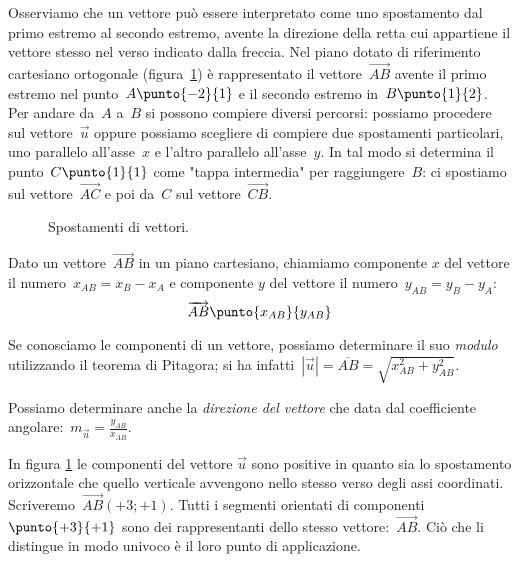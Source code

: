 Osserviamo che un vettore può essere interpretato come uno spostamento dal 
primo estremo al secondo estremo, avente la direzione della retta cui appartiene 
il vettore stesso nel
verso indicato dalla freccia.
Nel piano dotato di riferimento cartesiano ortogonale (figura~\ref{fig:F.4}) 
è rappresentato il vettore~$\overrightarrow{AB}$ avente 
il primo estremo nel punto~$A\punto{-2}{1}$ e
il secondo estremo in~$B\punto{1}{2}$. 
Per andare da~$A$ a~$B$ si possono compiere diversi percorsi: 
possiamo procedere sul vettore~$\vec{u}$ oppure possiamo scegliere di compiere 
due spostamenti particolari,
uno parallelo all'asse~$x$ e l'altro parallelo all'asse~$y$. In tal modo si 
determina il punto~$C\punto{1}{1}$ come "tappa intermedia" per 
raggiungere~$B$:
ci spostiamo sul vettore~$\overrightarrow{AC}$ e poi da~$C$ sul 
vettore~$\overrightarrow{CB}$.

\begin{inaccessibleblock}
 \begin{figure}[b]
\centering

\caption{Spostamenti di vettori.}\label{fig:F.4}
\end{figure}
\end{inaccessibleblock}


\begin{definizione}
Dato un vettore~$\overrightarrow{AB}$ in un piano cartesiano, chiamiamo 
componente \(x\) del vettore il numero~\(x_{AB} = x_B - x_A\) e 
componente \(y\) del vettore il numero~\(y_{AB} = y_B - y_A\):
\[\overrightarrow{AB}\punto{x_{AB}}{y_{AB}}\]
\end{definizione}

Se conosciamo le componenti di un vettore, possiamo determinare il suo 
\emph{modulo} utilizzando il teorema di Pitagora; 
si ha infatti~$|\vec{u}|=\overline{AB}=\sqrt{x_{AB}^2+y_{AB}^2}$.

Possiamo determinare anche la \emph{direzione del vettore} che data 
dal coefficiente angolare:~$m_{\vec{u}}=\frac{y_{AB}}{x_{AB}}$.

In figura \ref{fig:F.4} le componenti del vettore \(\vec{u}\) sono positive 
in quanto sia lo spostamento orizzontale che quello verticale avvengono nello 
stesso verso degli assi coordinati. 
Scriveremo~$\overrightarrow{AB}(+3;+1)$. 
Tutti i segmenti orientati di componenti~$\punto{+3}{+1}$ sono 
dei rappresentanti dello stesso vettore:~$\overrightarrow{AB}$.
Ciò che li distingue in modo univoco è il loro punto di applicazione.


